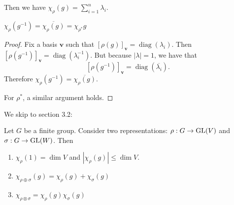
Then we have $\chi_\rho(g) = \sum_{i=1}^{n}\lambda_i$.

\begin{corollary}
    $\chi_\rho(g^{-1}) = \overline{\chi_\rho (g)} = \chi_{\rho^{*}} g$
\end{corollary}

\begin{proof}
    Fix a basis $\mathbf{v}$ such that $[\rho(g)]_{\mathbf{v}} = \operatorname{diag}(\lambda_i)$.
    Then $[\rho(g^{-1})]_{\mathbf{v}} = \operatorname{diag}(\lambda_i ^{-1})$.
    But because $|\lambda| = 1$, we have that
     \[
         [\rho(g^{-1})]_{\mathbf{v}} = \operatorname{diag}(\overline{\lambda_i})
    .\] 
    Therefore $\chi_\rho(g^{-1}) = \overline{\chi_\rho (g)}$.

    For $\rho^*$, a similar argument holds.
\end{proof}

We skip to section 3.2:


\begin{theorem}[3.10]
    Let $G$ be a finite group.
    Consider two representations: $\rho: G \to \operatorname{GL}(V)$ and $\sigma: G \to \operatorname{GL}(W)$.
    Then 
    \begin{enumerate}[(1)]
        \item $\chi_\rho(1) = \dim V$ and  $|\chi_\rho(g)| \le  \dim V$.
        \item $\chi_{\rho \oplus \sigma} (g)= \chi_{\rho}(g) + \chi_\sigma (g)$
        \item $\chi_{\rho \otimes \sigma} = \chi_\rho(g) \chi_\sigma(g)$
    \end{enumerate}
\end{theorem}


